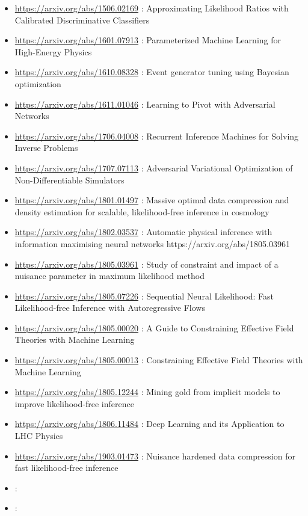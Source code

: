 \begin{itemize}
    \item \url{https://arxiv.org/abs/1506.02169} : Approximating Likelihood Ratios with Calibrated Discriminative Classifiers
    \item \url{https://arxiv.org/abs/1601.07913} : Parameterized Machine Learning for High-Energy Physics
    \item \url{https://arxiv.org/abs/1610.08328} : Event generator tuning using Bayesian optimization
    \item \url{https://arxiv.org/abs/1611.01046} : Learning to Pivot with Adversarial Networks
    \item \url{https://arxiv.org/abs/1706.04008} : Recurrent Inference Machines for Solving Inverse Problems
    \item \url{https://arxiv.org/abs/1707.07113} : Adversarial Variational Optimization of Non-Differentiable Simulators
    \item \url{https://arxiv.org/abs/1801.01497} : Massive optimal data compression and density estimation for scalable, likelihood-free inference in cosmology
    \item \url{https://arxiv.org/abs/1802.03537} : Automatic physical inference with information maximising neural networks
    https://arxiv.org/abs/1805.03961
    \item \url{https://arxiv.org/abs/1805.03961} : Study of constraint and impact of a nuisance parameter in maximum likelihood method
    \item \url{https://arxiv.org/abs/1805.07226} : Sequential Neural Likelihood: Fast Likelihood-free Inference with Autoregressive Flows
    \item \url{https://arxiv.org/abs/1805.00020} : A Guide to Constraining Effective Field Theories with Machine Learning
    \item \url{https://arxiv.org/abs/1805.00013} : Constraining Effective Field Theories with Machine Learning
    \item \url{https://arxiv.org/abs/1805.12244} : Mining gold from implicit models to improve likelihood-free inference
    \item \url{https://arxiv.org/abs/1806.11484} : Deep Learning and its Application to LHC Physics
    \item \url{https://arxiv.org/abs/1903.01473} : Nuisance hardened data compression for fast likelihood-free inference
    \item \url{} : 
    \item \url{} : 

\end{itemize}
